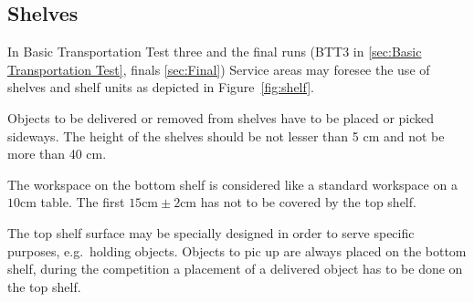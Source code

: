 

\subsection{Shelves}\label{sec:Shelves}
In Basic Transportation Test three and the final runs (BTT3 in \ref{sec:Basic Transportation Test}, finals \ref{sec:Final}) Service areas may foresee the use of shelves and shelf units as depicted in Figure~\ref{fig:shelf}. 

Objects to be delivered or removed from shelves have to be placed or picked sideways. The height of the shelves should be not lesser than 5 cm and not be more than 40 cm.

The workspace on the bottom shelf is considered like a standard workspace on a $10\si{\centi\meter}$ table. The first $15 \si{\centi\meter}\pm 2\si{\centi\meter} $ has not to be covered by the top shelf. 

The top shelf surface may be specially designed in order to serve specific purposes, e.g.\, holding objects. Objects to pic up are always placed on the bottom shelf, during the competition a placement of a delivered object has to be done on the top shelf.  

